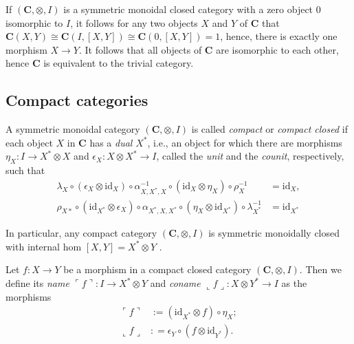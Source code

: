 \documentclass[12pt]{tac}
\theoremstyle{definition}
\theoremstyle{remark}
\newcommand{\<}{\langle}
\renewcommand{\>}{\rangle}
\renewcommand{\:}{\colon}
\newcommand{\id}{\mathrm{id}}
\renewcommand{\name}[1]{\ulcorner #1\urcorner}
\newcommand{\coname}[1]{\llcorner #1\lrcorner}
\begin{document}
If $(\mathbf C,\otimes,I)$ is a symmetric monoidal closed category with a zero object $0$ isomorphic to $I$, it follows for any two objects $X$ and $Y$ of $\mathbf C$ that $\mathbf C(X,Y)\cong\mathbf C(I,[X,Y])\cong\mathbf C(0,[X,Y])=1$, hence, there is exactly one morphism $X\to Y$. It follows that all objects of $\mathbf C$ are isomorphic to each other, hence $\mathbf C$ is equivalent to the trivial category. 




\subsection{Compact categories}

       A symmetric monoidal category $(\mathbf C,\otimes,I)$ is called \emph{compact} or \emph{compact closed} if each object $X$ in $\mathbf C$ has a \emph{dual} $X^*$, i.e., an object for which there are morphisms  $\eta_X:I\to X^*\otimes X$ and $\epsilon_X:X\otimes X^*\to I$, called the \emph{unit} and the \emph{counit}, respectively, such that
    \begin{align}
\label{eq:compact1}        \lambda _{X}\circ (\epsilon _{X}\otimes \id_X)\circ \alpha _{{X,X^{*},X}}^{{-1}}\circ (\id_X\otimes \eta _{X})\circ \rho _{X}^{{-1}} & =\id_{X},\\
  \label{eq:compact2}      \rho_{X*}\circ(\id_{X^*}\otimes\epsilon_{X})\circ\alpha_{X^*,X,X^*}\circ(\eta_X\otimes\id_{X^*})\circ\lambda_{X^*}^{-1} & = \id_{X^*}
    \end{align}

   
In particular, any compact category $(\mathbf C,\otimes,I)$ is symmetric monoidally closed with internal hom $[X,Y]=X^*\otimes Y$ \cite{Kelly-Laplaza}.




    Let $f:X\to Y$ be a morphism in a compact closed category $(\mathbf C,\otimes,I)$. Then we define its \emph{name} $\name{f}:I\to X^*\otimes Y$ and \emph{coname} $\coname{f}:X\otimes Y^*\to I$ as the morphisms
    \begin{align*}
        \name{f} & :=(\id_{X^*}\otimes f)\circ\eta_X;\\
        \coname f &: = \epsilon_Y\circ (f\otimes\id_{Y^*}).
    \end{align*}
\end{document}
